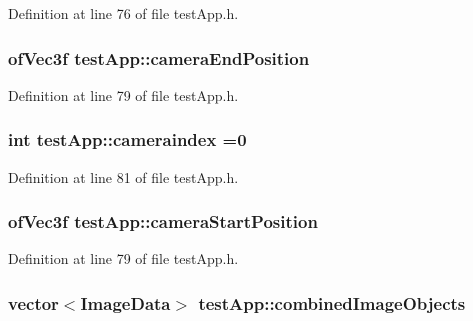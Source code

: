Definition at line 76 of file test\-App.\-h.

\hypertarget{classtest_app_ad3319d9cd3cb00e898f4f602b879efad}{
\subsubsection[{camera\-End\-Position}]{\setlength{\rightskip}{0pt plus 5cm}of\-Vec3f test\-App\-::camera\-End\-Position}}\label{classtest_app_ad3319d9cd3cb00e898f4f602b879efad}


Definition at line 79 of file test\-App.\-h.

\hypertarget{classtest_app_a4ca3a51642dedbf37f2b9f6ef96510c7}{
\subsubsection[{cameraindex}]{\setlength{\rightskip}{0pt plus 5cm}int test\-App\-::cameraindex =0}}\label{classtest_app_a4ca3a51642dedbf37f2b9f6ef96510c7}


Definition at line 81 of file test\-App.\-h.

\hypertarget{classtest_app_ac01013264b9988207e7fd9e0a486ff2f}{
\subsubsection[{camera\-Start\-Position}]{\setlength{\rightskip}{0pt plus 5cm}of\-Vec3f test\-App\-::camera\-Start\-Position}}\label{classtest_app_ac01013264b9988207e7fd9e0a486ff2f}


Definition at line 79 of file test\-App.\-h.

\hypertarget{classtest_app_aced9b8a8419c8465877c2c9cd43f8934}{
\subsubsection[{combined\-Image\-Objects}]{\setlength{\rightskip}{0pt plus 5cm}vector$<${\bf Image\-Data}$>$ test\-App\-::combined\-Image\-Objects}}\label{classtest_app_aced9b8a8419c8465877c2c9cd43f8934}


